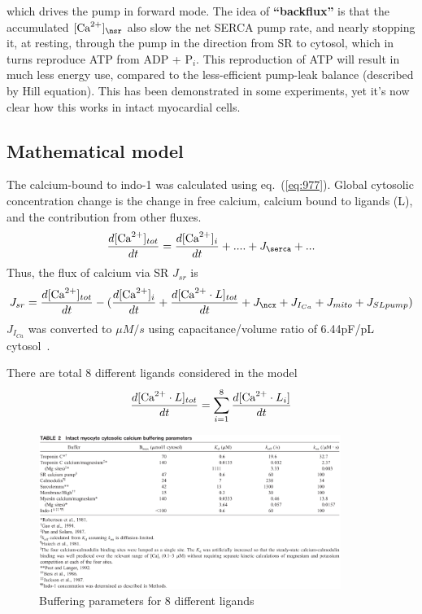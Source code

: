 which drives the pump in forward mode. The idea of {\bf ``backflux''}
is that the accumulated $[\Ca]_\nsr$ also slow the net SERCA pump
rate, and nearly stopping it, at resting, through the pump in the
direction from SR to cytosol, which in turns reproduce ATP from ADP +
P$_i$. This reproduction of ATP will result in much less energy use,
compared to the less-efficient pump-leak balance (described by Hill
equation). This has been demonstrated in some experiments, yet it's
now clear how this works in intact myocardial cells.


\subsection{Mathematical model}
\label{sec:mathematical-model-15}

The calcium-bound to indo-1 was calculated using eq.~(\ref{eq:977}).
Global cytosolic concentration change is the change in free calcium,
calcium bound to ligands (L), and the contribution from other fluxes.
\begin{equation}
  \label{eq:982}
  \frac{d[\Ca]_{tot}}{dt} = \frac{d[\Ca]_i}{dt}  + .... + J_\serca + ...
\end{equation}
Thus, the flux of calcium via SR $J_{sr}$ is
\begin{equation}
  \label{eq:981}
  J_{sr} = \frac{d[\Ca]_{tot}}{dt} - (\frac{d[\Ca]_i}{dt} +
  \frac{d[\Ca\cdot L]_{tot}}{dt} + J_\ncx + J_{I_{Ca}} + J_{mito} + J_{SLpump})
\end{equation}
$J_{I_{Ca}}$ was converted to $\mu M/s$ using capacitance/volume ratio
of 6.44pF/pL cytosol~\citep{sipido1991}.

There are total 8 different ligands considered in the model
\begin{equation}
  \label{eq:983}
  \frac{d[{\text{Ca}^{2+}}\cdot L]_{tot}}{dt}= \sum^8_{i=1} \frac{d[{\text{Ca}^{2+}}\cdot L_i]}{dt}
\end{equation}
\begin{figure}[hbt]
  \centerline{\includegraphics[height=5cm,
    angle=0]{./images/shannon_ligands.eps}}
\caption{Buffering parameters for 8 different ligands}
\label{fig:shannon_buffers}
\end{figure}

